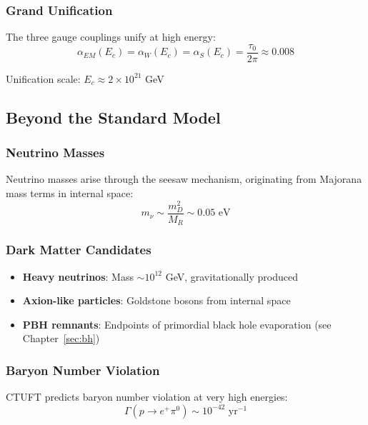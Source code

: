 \subsubsection{Grand Unification}

The three gauge couplings unify at high energy:
\begin{equation}
    \alpha_{EM}(E_c) = \alpha_W(E_c) = \alpha_S(E_c) = \frac{\tau_0}{2\pi} \approx 0.008
\end{equation}

Unification scale: $E_c \approx 2 \times 10^{21}$ GeV

\subsection{Beyond the Standard Model}

\subsubsection{Neutrino Masses}

Neutrino masses arise through the seesaw mechanism, originating from Majorana mass terms in internal space:
\begin{equation}
    m_\nu \sim \frac{m_D^2}{M_R} \sim 0.05 \text{ eV}
\end{equation}

\subsubsection{Dark Matter Candidates}

\begin{itemize}
    \item \textbf{Heavy neutrinos}: Mass $\sim 10^{12}$ GeV, gravitationally produced
    \item \textbf{Axion-like particles}: Goldstone bosons from internal space
    \item \textbf{PBH remnants}: Endpoints of primordial black hole evaporation (see Chapter~\ref{sec:bh})
\end{itemize}

\subsubsection{Baryon Number Violation}

CTUFT predicts baryon number violation at very high energies:
\begin{equation}
    \Gamma(p \to e^+ \pi^0) \sim 10^{-42} \text{ yr}^{-1}
\end{equation}

